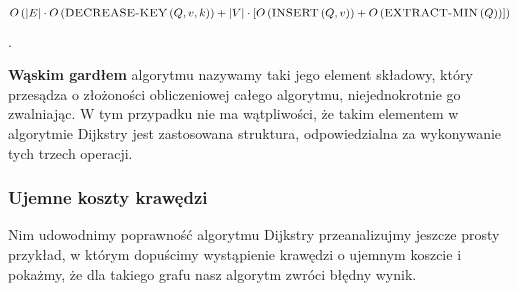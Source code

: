 \begin{equation}
O \left( \left| E \right| \cdot O \left( \textrm{\textsc{DECREASE-KEY}} \left( Q, v, k \right) \right) + \left| V \right| \cdot \left[ O \left( \textrm{\textsc{INSERT}} \left( Q, v \right) \right) + O \left( \textrm{\textsc{EXTRACT-MIN}} \left( Q \right) \right) \right] \right)
\end{equation}\label{eq:dijkstraComplexity}.

\textbf{Wąskim gardłem} algorytmu nazywamy taki jego element składowy, który przesądza o złożoności obliczeniowej całego algorytmu, niejednokrotnie go zwalniając. W tym przypadku nie ma wątpliwości, że takim elementem w algorytmie Dijkstry jest zastosowana struktura, odpowiedzialna za wykonywanie tych trzech operacji.

\subsubsection{Ujemne koszty krawędzi}

Nim udowodnimy poprawność algorytmu Dijkstry przeanalizujmy jeszcze prosty przykład, w którym dopuścimy wystąpienie krawędzi o ujemnym koszcie i pokażmy, że dla takiego grafu nasz algorytm zwróci błędny wynik.


